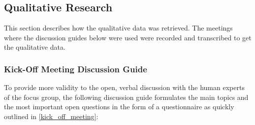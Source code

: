 \documentclass[draft,final]{thesisclass} %
\begin{document}
\subsection{Qualitative Research}
This section describes how the qualitative data was retrieved.
The meetings where the discussion guides below were used were recorded and transcribed to get the qualitative data.

\subsubsection{Kick-Off Meeting Discussion Guide}
To provide more validity to the open, verbal discussion with the human experts of the focus group, the following discussion guide formulates the main topics and the most important open questions in the form of a questionnaire as quickly outlined in \ref{kick_off_meeting}:
\end{document}
